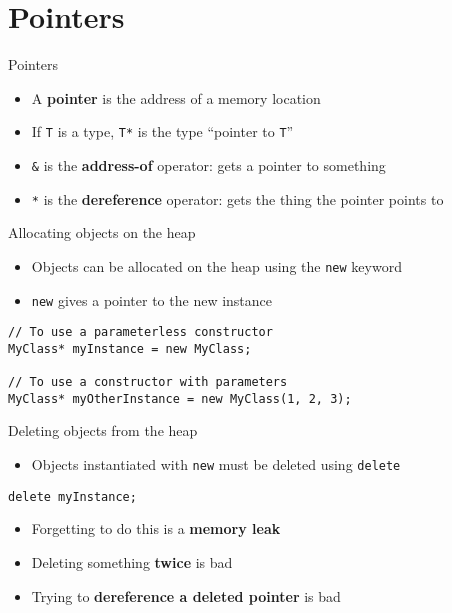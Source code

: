 \part{Pointers}
\frame{\partpage}

\begin{frame}[fragile]{Pointers}
    \begin{itemize}
        \item A \textbf{pointer} is the address of a memory location \pause
        \item If \lstinline{T} is a type, \lstinline{T*} is the type ``pointer to \lstinline{T}'' \pause
        \item \lstinline{&} is the \textbf{address-of} operator: gets a pointer to something \pause
        \item \lstinline{*} is the \textbf{dereference} operator: gets the thing the pointer points to
    \end{itemize}
\end{frame}

\begin{frame}[fragile]{Allocating objects on the heap}
    \begin{itemize}
        \item Objects can be allocated on the heap using the \lstinline{new} keyword \pause
        \item \lstinline{new} gives a pointer to the new instance
    \end{itemize}
    \pause
    \begin{lstlisting}
// To use a parameterless constructor
MyClass* myInstance = new MyClass;

// To use a constructor with parameters
MyClass* myOtherInstance = new MyClass(1, 2, 3);
    \end{lstlisting}
\end{frame}

\begin{frame}[fragile]{Deleting objects from the heap}
    \begin{itemize}
        \item Objects instantiated with \lstinline{new} must be deleted using \lstinline{delete} \pause
    \end{itemize}
    \begin{lstlisting}
delete myInstance;
    \end{lstlisting}
    \pause
    \begin{itemize}
        \item Forgetting to do this is a \textbf{memory leak} \pause
        \item Deleting something \textbf{twice} is bad \pause
        \item Trying to \textbf{dereference a deleted pointer} is bad
    \end{itemize}
\end{frame}

